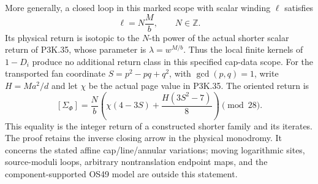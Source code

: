 \begin{theorem}
More generally, a closed loop in this marked scope with scalar
winding \(\ell\) satisfies
\[
                       \ell=N\frac{M}{b},\qquad N\in\mathbb Z.
\]
Its physical return is isotopic to the \(N\)-th power of the
actual shorter scalar return of P3K.35, whose parameter is
\(\lambda=w^{M/b}\). Thus the local finite kernels of \(1-D_i\)
produce no additional return class in this specified cap-data scope.
For the transported fan coordinate \(S=p^2-pq+q^2\), with
\(\gcd(p,q)=1\), write \(H=Ma^2/d\) and let \(\chi\) be the
actual page value in P3K.35. The oriented return is
\[
 [\Sigma_\Phi]
 =\frac{N}{b}\left(\chi(4-3S)+\frac{H(3S^2-7)}8\right)
                         \pmod{28}.
\]
This equality is the integer return of a constructed shorter family
and its iterates. The proof retains the inverse closing arrow in the
physical monodromy. It concerns the stated affine cap/line/annular
variations; moving logarithmic sites, source-moduli loops, arbitrary
nontranslation endpoint maps, and the component-supported OS49
model are outside this statement.

\end{theorem}
